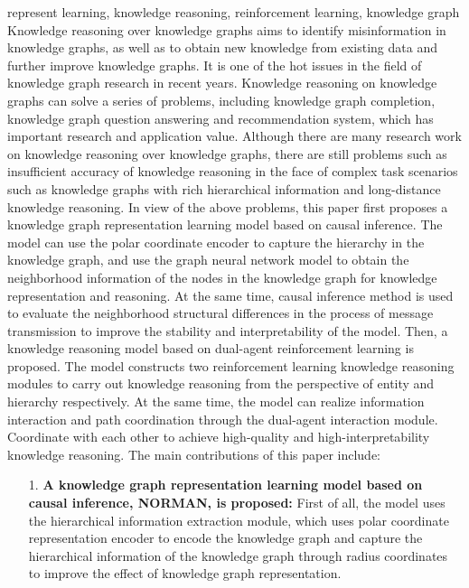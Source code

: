 \documentclass[algorithmlist, AutoFakeBold, AutoFakeSlant, figurelist, tablelist, nomlist, engineering]{seuthesix}
\begin{document}
\begin{englishabstract}{represent learning, knowledge reasoning, reinforcement learning, knowledge graph}
  Knowledge reasoning over knowledge graphs aims to identify misinformation in knowledge graphs, as well as to obtain new knowledge from existing data and further improve knowledge graphs. 
  It is one of the hot issues in the field of knowledge graph research in recent years. 
  Knowledge reasoning on knowledge graphs can solve a series of problems, including knowledge graph completion, knowledge graph question answering and recommendation system, which has important research and application value. 
  Although there are many research work on knowledge reasoning over knowledge graphs, there are still problems such as insufficient accuracy of knowledge reasoning in the face of complex task scenarios such as knowledge graphs with rich hierarchical information and long-distance knowledge reasoning. 
  In view of the above problems, this paper first proposes a knowledge graph representation learning model based on causal inference. 
  The model can use the polar coordinate encoder to capture the hierarchy in the knowledge graph, and use the graph neural network model to obtain the neighborhood information of the nodes in the knowledge graph for knowledge representation and reasoning. 
  At the same time, causal inference method is used to evaluate the neighborhood structural differences in the process of message transmission to improve the stability and interpretability of the model.
  Then, a knowledge reasoning model based on dual-agent reinforcement learning is proposed. 
  The model constructs two reinforcement learning knowledge reasoning modules to carry out knowledge reasoning from the perspective of entity and hierarchy respectively. 
  At the same time, the model can realize information interaction and path coordination through the dual-agent interaction module.
  Coordinate with each other to achieve high-quality and high-interpretability knowledge reasoning. 
  The main contributions of this paper include:
  \begin{itemize}
    \item [1.]\textbf{A knowledge graph representation learning model based on causal inference, NORMAN, is proposed:}
    First of all, the model uses the hierarchical information extraction module, which uses polar coordinate representation encoder to encode the knowledge graph and capture the hierarchical information of the knowledge graph through radius coordinates to improve the effect of knowledge graph representation.

\end{itemize}
\end{englishabstract}
\end{document}
